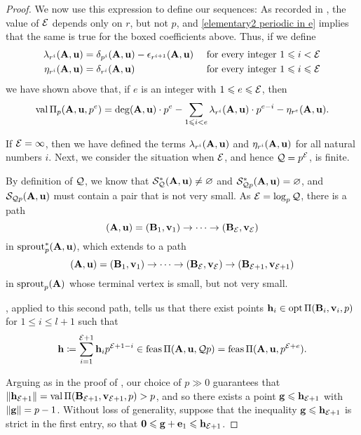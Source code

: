 \documentclass{amsart}
\begin{document}
\begin{proof}
   We now use this expression to define our sequences:  As recorded in , the value of $\mathcal{E}$ depends only on $r$, but not $p$, and \eqref{elementary2 periodic in e} implies that the same is true for the boxed coefficients above.  Thus, if we define 
   \begin{align*}
   \lambda_{r^i}(\mathbf{A}, \mathbf{u}) & = \delta_{p^i}(\mathbf{A}, \mathbf{u}) - \epsilon_{r^{i+1}}(\mathbf{A}, \mathbf{u}) & \text{ for every integer } 1 \leqslant i  < \mathcal{E} \\ 
   \eta_{r^i}(\mathbf{A}, \mathbf{u}) & = \delta_{r^i}(\mathbf{A}, \mathbf{u}) & \text{ for every integer } 1 \leqslant i \leqslant \mathcal{E}
  \end{align*}   
   we have shown above that, if $e$ is an integer with $1 \leqslant e \leqslant \mathcal{E}$, then
   \begin{equation}
   \label{val-up-to-curly-e-via-two-sequences: e}
   \operatorname{val} \Pi_p(\mathbf{A},\mathbf{u},p^e) = \operatorname{deg}(\mathbf{A}, \mathbf{u}) \cdot p^e - \sum_{1 \leqslant i < e} \lambda_{r^i}(\mathbf{A}, \mathbf{u}) \cdot p^{e-i} - {\eta_{r^e}(\mathbf{A}, \mathbf{u})}.
   \end{equation}
   
   If $\mathcal{E} = \infty$, then we have defined the terms $\lambda_{r^i}(\mathbf{A}, \mathbf{u})$ and $\eta_{r^i}(\mathbf{A}, \mathbf{u})$ for all natural numbers $i$. Next, we consider the situation when $\mathcal{E}$, and hence $\mathcal{Q} = p^{\mathcal{E}}$, is finite.
   
   By definition of $\mathcal{Q}$, we know that $\mathcal{S}_{\mathcal{Q}}^{\ast}(\mathbf{A},\mathbf{u}) \neq \varnothing$ and $\mathcal{S}^{\ast}_{\mathcal{Q} p}(\mathbf{A},\mathbf{u}) = \varnothing$, and $\mathcal{S}_{\mathcal{Q} p}(\mathbf{A},\mathbf{u})$ must contain a pair that is not very small.  As $\mathcal{E} = \log_p \mathcal{Q}$, there is a path
   \begin{equation}\label{eq: first path}
      (\mathbf{A},\mathbf{u}) = (\mathbf{B}_1,\mathbf{v}_1) \to \cdots \to (\mathbf{B}_{\mathcal{E}}, \mathbf{v}_{\mathcal{E}})
   \end{equation}
   in $\operatorname{sprout}_p^{\ast}(\mathbf{A},\mathbf{u})$, which extends to a path
   \[
      (\mathbf{A},\mathbf{u}) = (\mathbf{B}_1,\mathbf{v}_1) \to \cdots \to (\mathbf{B}_{\mathcal{E}}, \mathbf{v}_{\mathcal{E}}) \to (\mathbf{B}_{\mathcal{E}+1}, \mathbf{v}_{\mathcal{E}+1})
   \]
   in $\operatorname{sprout}_p(\mathbf{A})$ whose terminal vertex is small, but not very small.
   
   , applied to this second path, tells us that there exist points $\mathbf{h}_i \in \operatorname{opt} \Pi(\mathbf{B}_i, \mathbf{v}_i, p)$ for $1\le i\le l+1$ such that
   \[
      \mathbf{h} \coloneqq \sum_{i=1}^{\mathcal{E}+1} \mathbf{h}_i p^{\mathcal{E}+1-i} \in \operatorname{feas} \Pi(\mathbf{A},\mathbf{u}, \mathcal{Q} p) = \operatorname{feas} \Pi(\mathbf{A},\mathbf{u}, p^{\mathcal{E}+e}).
   \] 
   
   Arguing as in the proof of , our choice of $p \gg 0$ guarantees that $\| \mathbf{h}_{\mathcal{E}+1} \| = \operatorname{val}\Pi(\mathbf{B}_{\mathcal{E}+1}, \mathbf{v}_{\mathcal{E}+1},p) > p$, and so there exists a point $\mathbf{g} \leqslant \mathbf{h}_{\mathcal{E}+1}$ with $\| \mathbf{g} \| = p-1$.
   Without loss of generality, suppose that the inequality $\mathbf{g} \leqslant \mathbf{h}_{\mathcal{E}+1}$ is strict in the first entry, so that $\mathbf{0} \leqslant \mathbf{g} + \mathbf{e}_1 \leqslant \mathbf{h}_{\mathcal{E}+1}$.


\end{proof}
\end{document}
